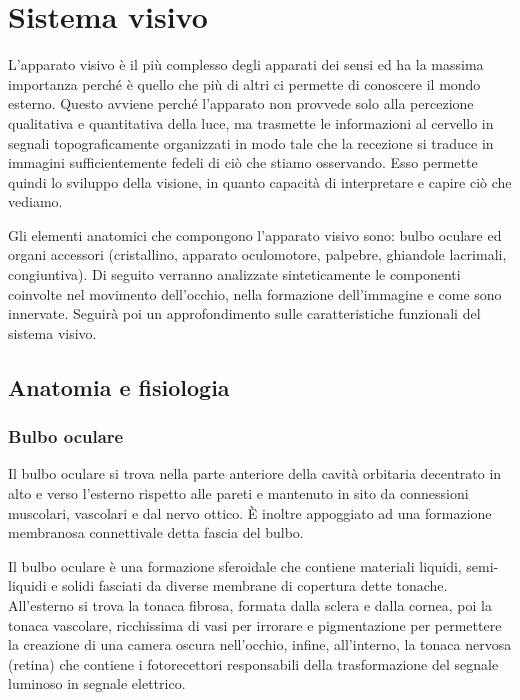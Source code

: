 
\chapter{Sistema visivo}

L’apparato visivo è il più complesso degli apparati dei sensi ed ha la massima importanza perché è quello che più di altri ci permette di conoscere il mondo esterno. Questo avviene perché l’apparato non provvede solo alla percezione qualitativa e quantitativa della luce, ma trasmette le informazioni al cervello in segnali topograficamente organizzati in modo tale che la recezione si traduce in immagini sufficientemente fedeli di ciò che stiamo osservando. Esso permette quindi lo sviluppo della visione, in quanto capacità di interpretare e capire ciò che vediamo.

Gli elementi anatomici che compongono l’apparato visivo sono: bulbo oculare ed organi accessori (cristallino, apparato oculomotore, palpebre, ghiandole lacrimali, congiuntiva). Di seguito verranno analizzate sinteticamente le componenti coinvolte nel movimento dell’occhio, nella formazione dell’immagine e come sono innervate. Seguirà  poi un approfondimento sulle caratteristiche funzionali del sistema visivo.

\section{Anatomia e fisiologia}

\subsection{Bulbo oculare}

Il bulbo oculare si trova nella parte anteriore della cavità orbitaria decentrato in alto e verso l’esterno rispetto alle pareti e mantenuto in sito da connessioni muscolari, vascolari e dal nervo ottico. È inoltre appoggiato ad una formazione membranosa connettivale detta fascia del bulbo. 

Il bulbo oculare è una formazione sferoidale che contiene materiali liquidi, semi-liquidi e solidi fasciati da diverse membrane di copertura dette tonache. All’esterno si trova la tonaca fibrosa, formata dalla sclera e dalla cornea, poi la tonaca vascolare, ricchissima di vasi per irrorare e pigmentazione per permettere la creazione di una camera oscura nell’occhio, infine, all’interno, la tonaca nervosa (retina) che contiene i fotorecettori responsabili della trasformazione del segnale luminoso in segnale elettrico.

